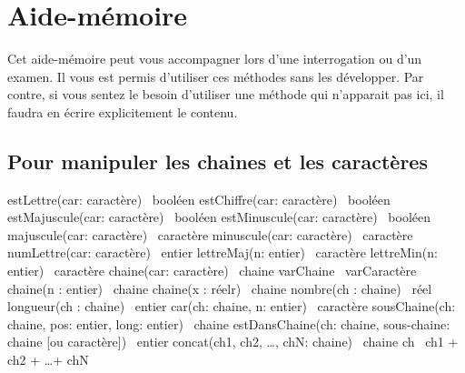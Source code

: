 \chapter{Aide-mémoire}

Cet aide-mémoire peut vous accompagner lors d'une
interrogation ou d'un examen. 
Il vous est permis d’utiliser ces méthodes sans les développer.
Par contre, si vous sentez le besoin d’utiliser 
une méthode qui n'apparait pas ici, 
il faudra en écrire explicitement le contenu.

\section{Pour manipuler les chaines et les caractères}

\begin{Pseudocode}
	\Empty
	\Stmt estLettre(car: caractère) \Gives~booléen		
	\Stmt estChiffre(car: caractère) \Gives~booléen		
	\Stmt estMajuscule(car: caractère) \Gives~booléen	
	\Stmt estMinuscule(car: caractère) \Gives~booléen	
	\Empty
	\Empty
	\Stmt majuscule(car: caractère) \Gives~caractère	
	\Stmt minuscule(car: caractère) \Gives~caractère	
	\Stmt numLettre(car: caractère) \Gives~entier		
	\Stmt lettreMaj(n: entier) \Gives~caractère			
	\Stmt lettreMin(n: entier) \Gives~caractère			
	\Stmt chaine(car: caractère) \Gives~chaine			
	\Let varChaine \Gets~varCaractère					
	\Stmt chaine(n : entier) \Gives~chaine				
	\Stmt chaine(x : réelr) \Gives~chaine				
	\Stmt nombre(ch : chaine) \Gives~réel				
	\Empty
	\Empty
	\Stmt longueur(ch : chaine) \Gives~entier			
	\Stmt car(ch: chaine, n: entier) \Gives~caractère	
	\Stmt sousChaine(ch: chaine, pos: entier, long: entier) \Gives~chaine 
	\Stmt estDansChaine(ch: chaine, sous-chaine: chaine [ou caractère]) \Gives~entier 
	\Stmt 	{}
	\Stmt concat(ch1, ch2, \dots, chN: chaine) \Gives~chaine 	
	\Let  ch \Gets~ch1 + ch2 + \dots + chN						
\end{Pseudocode}
